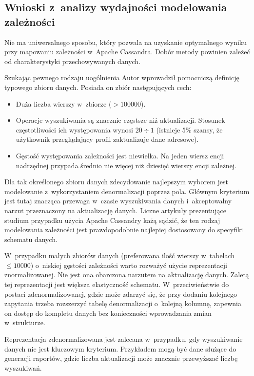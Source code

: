 \subsection{Wnioski z~analizy wydajności modelowania zależności}

Nie ma uniwersalnego sposobu, który pozwala na uzyskanie optymalnego wyniku przy mapowaniu zależności w~Apache Cassandra. Dobór metody powinien zależeć od charakterystyki przechowywanych danych. 

Szukając pewnego rodzaju uogólnienia Autor wprowadził pomocniczą definicję typowego zbioru danych. Posiada on zbiór następujących cech:

\begin{itemize}
	\item Duża liczba wierszy w~zbiorze ($> 100000$).
	\item Operacje wyszukiwania są znacznie częstsze niż aktualizacji. Stosunek częstotliwości ich występowania wynosi $20 \div 1$ (istnieje $5\%$ szansy, że użytkownik przeglądający profil zaktualizuje dane adresowe).
	\item Gęstość występowania zależności jest niewielka. Na jeden wiersz encji nadrzędnej przypada średnio nie więcej niż dziesięć wierszy encji zależnej. 
\end{itemize}

Dla tak określonego zbioru danych zdecydowanie najlepszym wyborem jest modelowanie z~wykorzystaniem denormalizacji poprzez pola. Głównym kryterium jest tutaj znacząca przewaga w~czasie wyszukiwania danych i~akceptowalny narzut przeznaczony na aktualizację danych. Liczne artykuły prezentujące studium przypadku użycia Apache Cassandry każą sądzić, że ten rodzaj modelowania zależności jest prawdopodobnie najlepiej dostosowany do specyfiki schematu danych. 

W~przypadku małych zbiorów danych (preferowana ilość wierszy w~tabelach $\leq 10000$) o~niskiej gęstości zależności warto rozważyć użycie reprezentacji znormalizowanej. Nie jest ona obarczona narzutem na aktualizację danych. Zaletą tej reprezentacji jest większa elastyczność schematu. W~przeciwieństwie do postaci zdenormalizowanej, gdzie może zdarzyć się, że przy dodaniu kolejnego zapytania trzeba rozszerzyć tabelę denormalizacji o~kolejną kolumnę, zapewnia on dostęp do kompletu danych bez konieczności wprowadzania zmian w~strukturze. 

Reprezentacja zdenormalizowana jest zalecana w~przypadku, gdy wyszukiwanie danych nie jest kluczowym kryterium. Przykładem mogą być dane służące do generacji raportów, gdzie liczba aktualizacji może znacznie przewyższać liczbę wyszukiwań. 

